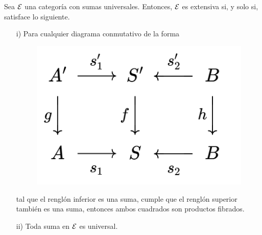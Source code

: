 \begin{theo}
    Sea ${\mathcal E}$ una categoría con sumas universales. Entonces, ${\mathcal E}$ es extensiva si, y solo si, satisface lo siguiente.
    \begin{enumerate}
        \item[i)] Para cualquier diagrama conmutativo de la forma
        \begin{figure}[H]
        \centering
        \includegraphics[width=0.3\linewidth]{img/diagrama1.5.4.png}
        \end{figure}
        tal que el renglón inferior es una suma, cumple que el renglón superior también es una suma, entonces ambos cuadrados son productos fibrados.
        \item[ii)] Toda suma en ${\mathcal E}$ es universal.
    \end{enumerate}
\end{theo}